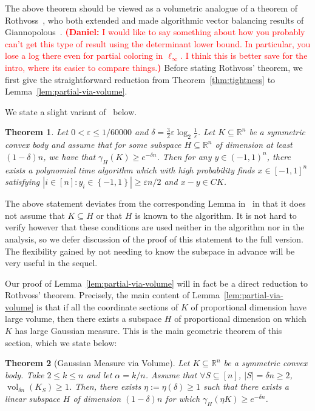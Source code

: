 \documentclass[12pt]{article}
\newtheorem{theorem}{Theorem}
\newcommand{\R}{{\mathbb{R}}}
\newcommand\eps{\varepsilon}
\newcommand{\set}[1]{\left\{ #1 \right\}}
\DeclareMathOperator{\vol}{vol}
\newcommand{\notename}[2]{{\textcolor{red}{\footnotesize{\bf (#1:} {#2}{\bf ) }}}}
\newcommand{\dnote}[1]{{\notename{Daniel}{#1}}}
\newcommand{\notename}[2]{{}}
\newcommand{\dnote}[1]{}
\begin{document}
The above theorem should be viewed as a volumetric analogue of a theorem of
Rothvoss~\cite{rothvoss-giann}, who both extended and made algorithmic vector
balancing results of Giannopolous~\cite{giannop}. \dnote{I would like to say
something about how you probably can't get this type of result using the
determinant lower bound. In particular, you lose a log there even for partial
coloring in $\ell_\infty$. I think this is better save for the intro, where its
easier to compare things.} Before stating Rothvoss' theorem, we first give the
straightforward reduction from Theorem~\ref{thm:tightness} to
Lemma~\ref{lem:partial-via-volume}. 

We state a slight variant of~\cite[Lemma 9]{rothvoss-giann} below.

\begin{theorem}\label{thm:roth-giann}
Let $0 < \eps \leq 1/60000$ and $\delta = \frac{3}{2}\eps \log_2
\frac{1}{\eps}$. Let $K \subseteq \R^n$ be a symmetric convex body and assume
that for some subspace $H \subseteq \R^n$ of dimension at least $(1-\delta)n$,
we have that $\gamma_H(K) \geq e^{-\delta n}$. Then for any $y \in (-1,1)^n$,
there exists a polynomial time algorithm which with high probability finds $x
\in [-1,1]^n$ satisfying $|i \in [n]: y_i \in \set{-1,1}| \geq \eps n/2$ and
$x-y \in CK$.
\end{theorem}

The above statement deviates from the corresponding Lemma
in~\cite{rothvoss-giann} in that it does not assume that $K \subseteq H$ or that
$H$ is known to the algorithm. It is not hard to verify however that these
conditions are used neither in the algorithm nor in the analysis, so we defer
discussion of the proof of this statement to the full version. The flexibility
gained by not needing to know the subspace in advance will be very useful in the
sequel.

Our proof of Lemma~\ref{lem:partial-via-volume} will in fact be a direct
reduction to Rothvoss' theorem. Precisely, the main content of
Lemma~\ref{lem:partial-via-volume} is that if all the coordinate sections of $K$
of proportional dimension have large volume, then there exists a subspace $H$ of
proportional dimension on which $K$ has large Gaussian measure. This is the main
geometric theorem of this section, which we state below: 

\begin{theorem}[Gaussian Measure via Volume]
\label{thm:gauss-via-volume}
Let $K \subseteq \R^n$ be a symmetric convex body. Take $2 \leq k \leq n$ and
let $\alpha = k/n$. Assume that $\forall S \subseteq [n]$, $|S| = \delta n \geq
2$, $\vol_{\delta n}(K_S) \geq 1$. Then, there exists $\eta := \eta(\delta) \geq
1$ such that there exists a linear subspace $H$ of dimension $(1-\delta)n$ for
which $\gamma_H(\eta K) \geq e^{-\delta n}$.
\end{theorem}
\end{document}

